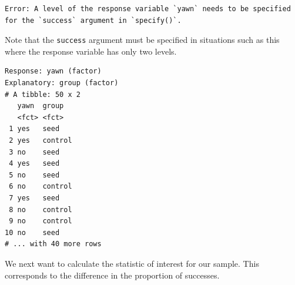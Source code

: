 \documentclass[12pt, krantz2,]{krantz}
\makeatletter
\newenvironment{Shaded}{\begin{snugshade}}{\end{snugshade}}
\newcommand{\DataTypeTok}[1]{\textcolor[rgb]{0.27,0.27,0.27}{#1}}
\newcommand{\KeywordTok}[1]{\textcolor[rgb]{0.27,0.27,0.27}{\textbf{#1}}}
\newcommand{\NormalTok}[1]{#1}
\newcommand{\OperatorTok}[1]{\textcolor[rgb]{0.43,0.43,0.43}{\textbf{#1}}}
\newcommand{\StringTok}[1]{\textcolor[rgb]{0.5,0.5,0.5}{#1}}
\newenvironment{kframe}{%
\medskip{}
\setlength{\fboxsep}{.8em}
 \def\at@end@of@kframe{}%
 \ifinner\ifhmode%
  \def\at@end@of@kframe{\end{minipage}}%
  \begin{minipage}{\columnwidth}%
 \fi\fi%
 \def\FrameCommand##1{\hskip\@totalleftmargin \hskip-\fboxsep
 \colorbox{shadecolor}{##1}\hskip-\fboxsep
     \hskip-\linewidth \hskip-\@totalleftmargin \hskip\columnwidth}%
 \MakeFramed {\advance\hsize-\width
   \@totalleftmargin\z@ \linewidth\hsize
   \@setminipage}}%
 {\par\unskip\endMakeFramed%
 \at@end@of@kframe}
\renewenvironment{Shaded}{\begin{kframe}}{\end{kframe}}
\makeatother
\begin{document}
\begin{Shaded}
\end{Shaded}

\begin{verbatim}
Error: A level of the response variable `yawn` needs to be specified
for the `success` argument in `specify()`.
\end{verbatim}

Note that the \texttt{success} argument must be specified in situations such as this where the response variable has only two levels.

\begin{Shaded}
\end{Shaded}

\begin{verbatim}
Response: yawn (factor)
Explanatory: group (factor)
# A tibble: 50 x 2
   yawn  group  
   <fct> <fct>  
 1 yes   seed   
 2 yes   control
 3 no    seed   
 4 yes   seed   
 5 no    seed   
 6 no    control
 7 yes   seed   
 8 no    control
 9 no    control
10 no    seed   
# ... with 40 more rows
\end{verbatim}

We next want to calculate the statistic of interest for our sample. This corresponds to the difference in the proportion of successes.

\begin{Shaded}
\end{Shaded}
\end{document}
